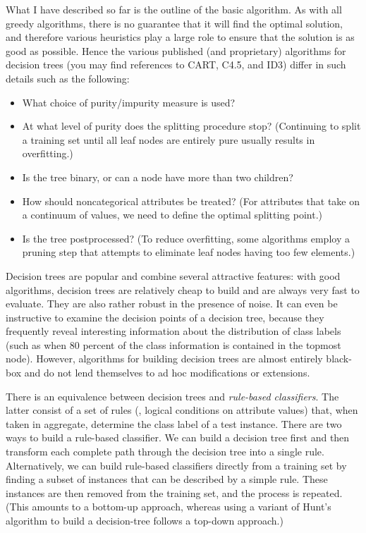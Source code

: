 What I have described so far is the outline of the basic algorithm.
As with all greedy algorithms, there is no guarantee that it will find
the optimal solution, and therefore various heuristics play a large
role to ensure that the solution is as good as possible. Hence the
various published (and proprietary) algorithms for decision trees (you
may find references to CART, C4.5, and ID3) differ in such details
such as the following:
\begin{itemize}
\item What choice of purity/impurity measure is used?
\item At what level of purity does the splitting procedure stop?
  (Continuing to split a training set until all leaf nodes are entirely
  pure usually results in overfitting.)\pagebreak
\item Is the tree binary, or can a node have more than two children?
\item How should noncategorical attributes be treated? (For attributes
  that take on a continuum of values, we need to define the optimal
  splitting point.)
\item Is the tree postprocessed? (To reduce overfitting, some
  algorithms employ a pruning step that attempts to eliminate leaf
  nodes having too few elements.)
\end{itemize}

Decision trees are popular and combine several attractive features:
with good algorithms, decision trees are relatively cheap to build and
are always very fast to evaluate. They are also rather robust in the
presence of noise. It can even be instructive to examine the decision
points of a decision tree, because they frequently reveal interesting
information about the distribution of class labels (such as when 80
percent of the class information is contained in the topmost node).
However, algorithms for building decision trees are almost entirely
black-box and do not lend themselves to ad hoc modifications or
extensions.

There is an equivalence between decision trees and \emph{rule-based
  classifiers}.  The latter consist of a set of rules (\ie, logical
conditions on attribute values) that, when taken in aggregate,
determine the class label of a test instance. There are two ways to
build a rule-based classifier. We can build a decision tree first and
then transform each complete path through the decision tree into a
single rule. Alternatively, we can build rule-based classifiers
directly from a training set by finding a subset of instances that can
be described by a simple rule. These instances are then removed from
the training set, and the process is repeated. (This amounts to a
bottom-up approach, whereas using a variant of Hunt's algorithm to
build a decision-tree follows a top-down approach.)

